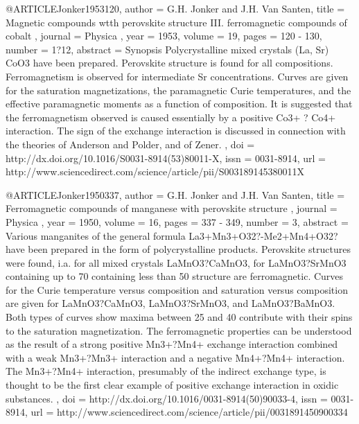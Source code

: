 @ARTICLE{Jonker1953120,
  author = {G.H. Jonker and J.H. Van Santen},
  title = {Magnetic compounds wtth perovskite structure III. ferromagnetic compounds
	of cobalt },
  journal = {Physica },
  year = {1953},
  volume = {19},
  pages = {120 - 130},
  number = {1?12},
  abstract = {Synopsis Polycrystalline mixed crystals (La, Sr) CoO3 have been prepared.
	Perovskite structure is found for all compositions. Ferromagnetism
	is observed for intermediate Sr concentrations. Curves are given
	for the saturation magnetizations, the paramagnetic Curie temperatures,
	and the effective paramagnetic moments as a function of composition.
	It is suggested that the ferromagnetism observed is caused essentially
	by a positive Co3+ ? Co4+ interaction. The sign of the exchange interaction
	is discussed in connection with the theories of Anderson and Polder,
	and of Zener. },
  doi = {http://dx.doi.org/10.1016/S0031-8914(53)80011-X},
  issn = {0031-8914},
  url = {http://www.sciencedirect.com/science/article/pii/S003189145380011X}
}

@ARTICLE{Jonker1950337,
  author = {G.H. Jonker and J.H. Van Santen},
  title = {Ferromagnetic compounds of manganese with perovskite structure },
  journal = {Physica },
  year = {1950},
  volume = {16},
  pages = {337 - 349},
  number = {3},
  abstract = {Various manganites of the general formula La3+Mn3+O32?-Me2+Mn4+O32?
	have been prepared in the form of polycrystalline products. Perovskite
	structures were found, i.a. for all mixed crystals LaMnO3?CaMnO3,
	for LaMnO3?SrMnO3 containing up to 70%
	containing less than 50%
	structure are ferromagnetic. Curves for the Curie temperature versus
	composition and saturation versus composition are given for LaMnO3?CaMnO3,
	LaMnO3?SrMnO3, and LaMnO3?BaMnO3. Both types of curves show maxima
	between 25 and 40%
	contribute with their spins to the saturation magnetization. The
	ferromagnetic properties can be understood as the result of a strong
	positive Mn3+?Mn4+ exchange interaction combined with a weak Mn3+?Mn3+
	interaction and a negative Mn4+?Mn4+ interaction. The Mn3+?Mn4+ interaction,
	presumably of the indirect exchange type, is thought to be the first
	clear example of positive exchange interaction in oxidic substances.
	},
  doi = {http://dx.doi.org/10.1016/0031-8914(50)90033-4},
  issn = {0031-8914},
  url = {http://www.sciencedirect.com/science/article/pii/0031891450900334}
}

